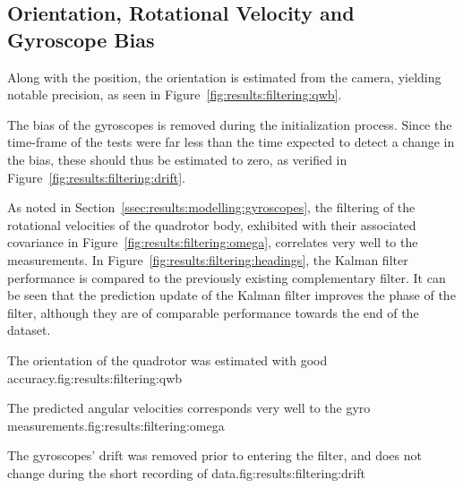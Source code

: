 \subsection{Orientation, Rotational Velocity and Gyroscope Bias}
    Along with the position, the orientation is estimated from the camera,
    yielding notable precision, as seen in Figure~\ref{fig:results:filtering:qwb}.

    The bias of the gyroscopes is removed during the initialization process.
    Since the time-frame of the tests were far less than the time expected to
    detect a change in the bias, these should thus be estimated to zero,
    as verified in Figure~\ref{fig:results:filtering:drift}.

    As noted in Section~\ref{ssec:results:modelling:gyroscopes}, the
    filtering of the rotational velocities of the quadrotor body,
    exhibited with their associated covariance in Figure~\ref{fig:results:filtering:omega},
    correlates very well to the measurements.
    In Figure~\ref{fig:results:filtering:headings}, the Kalman filter performance is compared
    to the previously existing complementary filter. It can be seen that
    the prediction update of the Kalman filter improves the phase of the filter,
    although they are of comparable performance towards the end of the dataset.

    \begin{subfigures}{The orientation of the quadrotor was estimated with good accuracy.}{fig:results:filtering:qwb}
    \end{subfigures}

    \begin{subfigures}{The predicted angular velocities corresponds very well to the gyro measurements.}{fig:results:filtering:omega}
    \end{subfigures}

    \begin{subfigures}{The gyroscopes' drift was removed prior to entering the filter, and does not change during the short recording of data.}{fig:results:filtering:drift}
    \end{subfigures}

